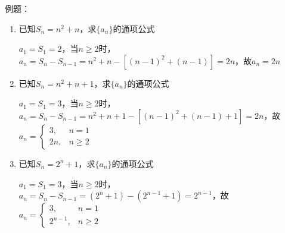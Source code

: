 例题：
\begin{enumerate}
    \item 已知$S_n = n^2+n$，求$\{a_n\}$的通项公式
    \begin{jieda}
        $a_1 = S_1 = 2$，当$n \geq 2$时，$a_n = S_n - S_{n-1} = n^2+n-[(n-1)^2+(n-1)] = 2n$，故$a_n = 2n$
    \end{jieda}
    \item 已知$S_n = n^2+n+1$，求$\{a_n\}$的通项公式    \begin{jieda}
        $a_1 = S_1 = 3$，当$n \geq 2$时，$a_n = S_n - S_{n-1} = n^2+n+1-[(n-1)^2+(n-1)+1] = 2n$，故$a_n = \left\{\begin{array}{ll}
             3, & n = 1 \\
             2n, & n \geq 2
        \end{array}\right.$
    \end{jieda}
    \item 已知$S_n = 2^n+1$，求$\{a_n\}$的通项公式
    \begin{jieda}
        $a_1 = S_1 = 3$，当$n \geq 2$时，$a_n = S_n - S_{n-1} = (2^n+1) - (2^{n-1}+1) = 2^{n-1}$，故$a_n = \left\{\begin{array}{ll}
             3, & n = 1 \\
             2^{n-1}, & n \geq 2
        \end{array}\right.$
    \end{jieda}
\end{enumerate}

